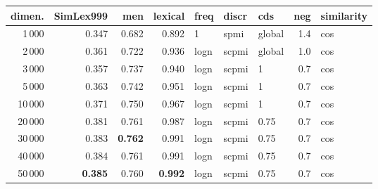 \begin{tabular}{rrrrlllrl}
\toprule
 dimen. &  SimLex999 &    men &  lexical &  freq &  discr &     cds &  neg & similarity \\
\midrule
           1\,000 &      0.347 &  0.682 &    0.892 &     1 &   spmi &  global &  1.4 &        cos \\
           2\,000 &      0.361 &  0.722 &    0.936 &  logn &  scpmi &  global &  1.0 &        cos \\
           3\,000 &      0.357 &  0.737 &    0.940 &  logn &  scpmi &       1 &  0.7 &        cos \\
           5\,000 &      0.363 &  0.742 &    0.951 &  logn &  scpmi &       1 &  0.7 &        cos \\
          10\,000 &      0.371 &  0.750 &    0.967 &  logn &  scpmi &       1 &  0.7 &        cos \\
          20\,000 &      0.381 &  0.761 &    0.987 &  logn &  scpmi &    0.75 &  0.7 &        cos \\
          30\,000 &      0.383 &  \textbf{0.762} &    0.991 &  logn &  scpmi &    0.75 &  0.7 &        cos \\
          40\,000 &      0.384 &  0.761 &    0.991 &  logn &  scpmi &    0.75 &  0.7 &        cos \\
          50\,000 &     \textbf{ 0.385} &  0.760 &    \textbf{0.992} &  logn &  scpmi &    0.75 &  0.7 &        cos \\
\bottomrule
\end{tabular}
